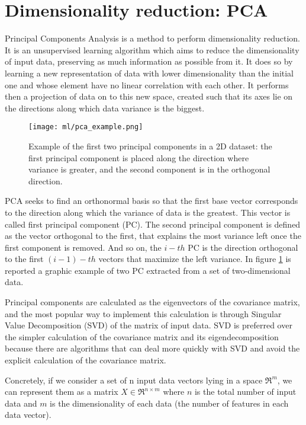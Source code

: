 \documentclass[11pt]{report}
\begin{document}
\section{Dimensionality reduction: PCA}



Principal Components Analysis is a method to perform dimensionality reduction.
It is an unsupervised learning algorithm which aims to reduce the dimensionality of input data, preserving as much information as possible from it.
It does so by learning a new representation of data with lower dimensionality than the initial one and whose element have no linear correlation with each other.
It performs then a projection of data on to this new space, created such that its axes lie on the directions along which data variance is the biggest.

\begin{figure}[h]
\centering
\texttt{[image: ml/pca\_example.png]}
\caption{Example of the first two principal components in a 2D dataset: the first principal component is placed along the direction where variance is greater,  and the second component is in the orthogonal direction.}
\label{fig:pca_example}
\end{figure}

PCA seeks to find an orthonormal basis so that the first base vector corresponds to the direction along which the variance of data is the greatest.
This vector is called first principal component (PC).
The second principal component is defined as the vector orthogonal to the first, that explains the most variance left once the first component is removed.
And so on, the $i-th$ PC is the direction orthogonal to the first $(i-1)-th$ vectors that maximize the left variance.
In figure \ref{fig:pca_example} is reported a graphic example of two PC extracted from a set of two-dimensional data.

Principal components are calculated as the eigenvectors of the covariance matrix, and the most popular way to implement this calculation is through Singular Value Decomposition (SVD) of the matrix of input data.
SVD is preferred over the simpler calculation of the covariance matrix and its eigendecomposition because there are algorithms that can deal more quickly with SVD and avoid the explicit calculation of the covariance matrix.

Concretely, if we consider a set of n input data vectors lying in a space $\Re^m$, we can represent them as a matrix $X \in \Re^{n \times m}$ where $n$ is the total number of input data and $m$ is the dimensionality of each data (the number of features in each data vector).
\end{document}
